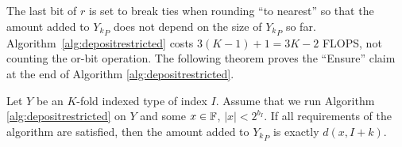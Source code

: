       The last bit of $r$ is set to break ties when rounding ``to nearest'' so
      that the amount added to ${Y_k}_P$ does not depend on the size of
      ${Y_k}_P$ so far.
      Algorithm~\ref{alg:depositrestricted} costs $3(K-1)+1=3K-2$ FLOPS,
      not counting the or-bit operation.
      The following theorem proves the ``Ensure'' claim at
      the end of Algorithm \ref{alg:depositrestricted}.

    \begin{samepage}
      \begin{thm}
        Let $Y$ be an $K$-fold indexed type of index $I$. Assume that we run
        Algorithm \ref{alg:depositrestricted} on $Y$ and some $x \in \mathbb{F}$, $|x|
        < 2^{b_I}$. If all requirements of the algorithm are satisfied, then
        the amount added to ${Y_k}_P$ is exactly $d(x, I + k)$.
        \label{thm:ddepositrestricted}
      \end{thm}
    \end{samepage}

